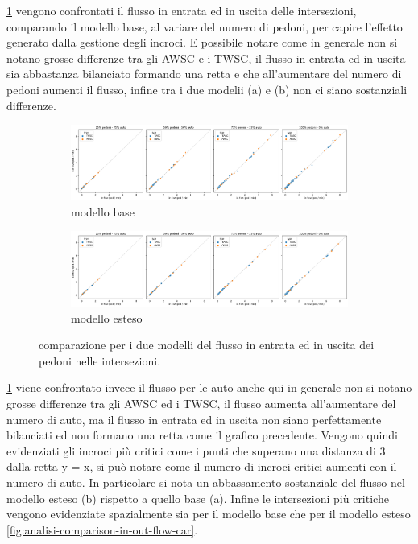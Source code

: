 \newpage


\ref{fig:analisi-comparison-in-out-flow-ped} vengono confrontati il flusso in entrata ed in uscita delle intersezioni,
comparando il modello base, al variare del numero di pedoni, per capire l'effetto generato dalla gestione degli incroci.
E possibile notare come in generale non si notano grosse differenze tra gli AWSC e i TWSC, 
il flusso in entrata ed in uscita sia abbastanza bilanciato formando una retta e che all'aumentare
del numero di pedoni aumenti il flusso, infine tra i due modelii (a) e (b) non ci siano sostanziali differenze.

\begin{figure}[ht]
    \centering
    \begin{subfigure}{0.99\textwidth}
        \centering
        \includegraphics[width=\textwidth]{images/analisi/comparison-base-in-out-flow-ped.png}
        \caption{modello base}
    \end{subfigure}
    \begin{subfigure}{0.99\textwidth}
        \centering
        \includegraphics[width=\textwidth]{images/analisi/comparison-new-in-out-flow-ped.png}
        \caption{modello esteso}
    \end{subfigure}
    \caption{comparazione per i due modelli del flusso in entrata ed in uscita dei pedoni nelle intersezioni.}
    \label{fig:analisi-comparison-in-out-flow-ped}
\end{figure}

\ref{fig:analisi-comparison-in-out-flow-ped} viene confrontato invece il flusso per le auto anche
qui in generale non si notano grosse differenze tra gli AWSC ed i TWSC, il flusso aumenta all'aumentare del numero di auto,
ma il flusso in entrata ed in uscita non siano perfettamente bilanciati ed non
formano una retta come il grafico precedente.
Vengono quindi evidenziati gli incroci più critici come i punti che superano una distanza di 3 dalla retta y = x,
si può notare come il numero di incroci critici aumenti con il numero di auto.
In particolare si nota un abbassamento sostanziale del flusso nel modello esteso (b)
rispetto a quello base (a).
Infine le intersezioni più critiche vengono evidenziate spazialmente sia per il modello base 
che per il modello esteso \ref{fig:analisi-comparison-in-out-flow-car}.

